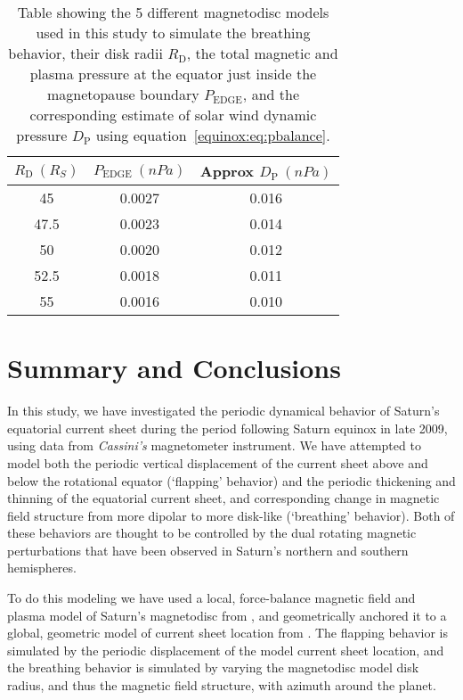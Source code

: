 \begin{table}
\caption[Model radii and solar wind dynamic pressure estimates for breathing magnetodisc models.]{Table showing the 5 different magnetodisc models used in this study to simulate the breathing behavior, their disk radii $R_\mathrm{D}$, the total magnetic and plasma pressure at the equator just inside the magnetopause boundary $P_\mathrm{EDGE}$, and the corresponding estimate of solar wind dynamic pressure $D_\mathrm{P}$ using equation~\ref{equinox:eq:pbalance}.}
\label{equinox:table:EdgePs}
\centering
\begin{tabular}{c c c}
\hline
$R_\mathrm{D}~(\si{R_S})$ & $P_\mathrm{EDGE}~(\si{nPa})$  & Approx $D_\mathrm{P}~(\si{nPa})$\\
\hline
45 & 0.0027 & 0.016 \\
47.5 & 0.0023 & 0.014\\
50 & 0.0020 & 0.012 \\
52.5 & 0.0018 & 0.011 \\
55 & 0.0016 & 0.010 \\
\hline
\end{tabular}
\end{table}

\section{Summary and Conclusions}\label{equinox:sec:conclusions}
In this study, we have investigated the periodic dynamical behavior of Saturn's equatorial current sheet during the period following Saturn equinox in late 2009, using data from \textit{Cassini's} magnetometer instrument. We have attempted to model both the periodic vertical displacement of the current sheet above and below the rotational equator (`flapping' behavior) and the periodic thickening and thinning of the equatorial current sheet, and corresponding change in magnetic field structure from more dipolar to more disk-like (`breathing' behavior). Both of these behaviors are thought to be controlled by the dual rotating magnetic perturbations that have been observed in Saturn's northern and southern hemispheres.

To do this modeling we have used a local, force-balance magnetic field and plasma model of Saturn's magnetodisc from \citet{achilleos2010a}, and geometrically anchored it to a global, geometric model of current sheet location from \citet{arridge2011}. The flapping behavior is simulated by the periodic displacement of the model current sheet location, and the breathing behavior is simulated by varying the magnetodisc model disk radius, and thus the magnetic field structure, with azimuth around the planet.

